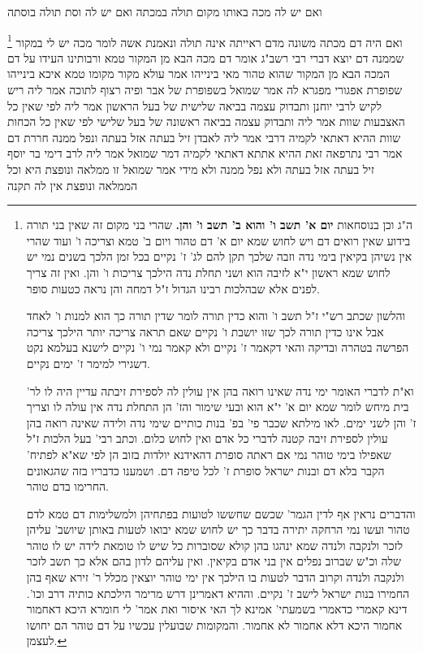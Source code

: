 \documentclass[12pt, openany]{book}
\newcommand{\footnotecomment}[1]{
	\renewcommand\thefootnote{}
	\footnote{#1}}
\newcommand{\commenta}[1]{\footnotecomment{#1}}
\begin{document}
{ואם יש לה מכה באותו מקום תולה במכתה ואם יש לה וסת תולה בוסתה 
\commenta{ה"ג וכן בנוסחאות \textbf{יום א' תשב ו' והוא ב' תשב ו' והן.} שהרי בני מקום זה שאין בני תורה בידוע שאין רואים דם ויש לחוש שמא יום א' דם טהור ויום ב' טמא וצריכה ו' ועוד שהרי אין נשיהן בקיאין בימי נדה וזבה שלכך תקן להם לג' ז' נקיים בכל זמן הלכך בשנים נמי יש לחוש שמא ראשון י"א לזיבה הוא ושני תחלת נדה הילכך צריכות ו' והן. ואין זה צריך לפנים אלא שבהלכות רבינו הגדול ז"ל דמחה והן נראה כטעות סופר.\par והלשון שכתב רש"י ז"ל תשב ו' והוא כדין תורה לומר שדין תורה כך הוא למנות ו' לאחד אבל אינו כדין תורה לכך שזו יושבת ו' נקיים שאם תראה צריכה יותר הילכך צריכה הפרשה בטהרה ובדיקה והאי דקאמר ז' נקיים ולא קאמר נמי ו' נקיים לישנא בעלמא נקט דשגירי למימר ז' ימים נקיים.\par וא"ת לדברי האומר ימי נדה שאינו רואה בהן אין עולין לה לספירת זיבתה עדיין היה לו לר' בית מיחש לומר שמא יום א' י"א הוא ובעי שימור והז' הן התחלת נדה אין עולה לו וצריך ז' והן לשני ימים. לאו מילתא שכבר פי' בפ' בנות כותיים שימי נדה ולידה שאינה רואה בהן עולין לספירת זיבה קטנה לדברי כל אדם ואין לחוש כלום. וכתב רבי' בעל הלכות ז"ל שאפילו בימי טוהר נמי אם ראתה סופרת דהאידנא יולדות בזוב הן לפי שא"א לפתיח' הקבר בלא דם ובנות ישראל סופרת ז' לכל טיפה דם. ושמענו כדבריו בזה שהגאונים החרימו בדם טוהר.\par והדברים נראין אף לדין הגמר' שכשם שחששו לטועות בפתחיהן ולמשלימות דם טמא לדם טהור ועשו נמי הרחקה יתירה בדבר כך יש לחוש שמא יבואו לטעות באותן שיושב' עליהן לזכר ולנקבה ולנדה שמא ינהגו בהן קולא שסוברות כל שיש לו טומאת לידה יש לו טוהר שלה וכ"ש שברוב נפלים אין בני אדם בקיאין. ואין עליהם לדון בהם אלא כך תשב לזכר ולנקבה ולנדה וקרוב הדבר לטעות בו הילכך אין ימי טוהר יוצאין מכלל ר' זירא שאף בהן החמירו בנות ישראל לישב ז' נקיים. וההיא דאמרינן דרש מרימר הילכתא כותיה דרב וכו'. דינא קאמרי כדאמרי בשמעתי' אמינא לך האי איסור ואת אמר' לי חומרא היכא דאחמור אחמור היכא דלא אחמור לא אחמור. והמקומות שבועלין עכשיו על דם טוהר הם יחושו לעצמן. }
ואם היה דם מכתה משונה מדם ראייתה אינה תולה ונאמנת אשה לומר מכה יש לי במקור שממנה דם יוצא דברי רבי 
רשב"ג אומר דם מכה הבא מן המקור טמא ורבותינו העידו על דם המכה הבא מן המקור שהוא טהור 
מאי בינייהו אמר עולא מקור מקומו טמא איכא בינייהו 
שפופרת אפגורי מפגרא לה אמר שמואל בשפופרת של אבר ופיה רצוף לתוכה 
אמר ליה ריש לקיש לרבי יוחנן ותבדוק עצמה בביאה שלישית של בעל הראשון אמר ליה לפי שאין כל האצבעות שוות 
אמר ליה ותבדוק עצמה בביאה ראשונה של בעל שלישי לפי שאין כל הכחות שוות 
ההיא דאתאי לקמיה דרבי אמר ליה לאבדן זיל בעתה אזל בעתה ונפל ממנה חררת דם אמר רבי נתרפאה זאת 
ההיא אתתא דאתאי לקמיה דמר שמואל אמר ליה לרב דימי בר יוסף זיל בעתה אזל בעתה ולא נפל ממנה ולא מידי אמר שמואל זו ממלאה ונופצת היא וכל הממלאה ונופצת אין לה תקנה 
}
\end{document}
